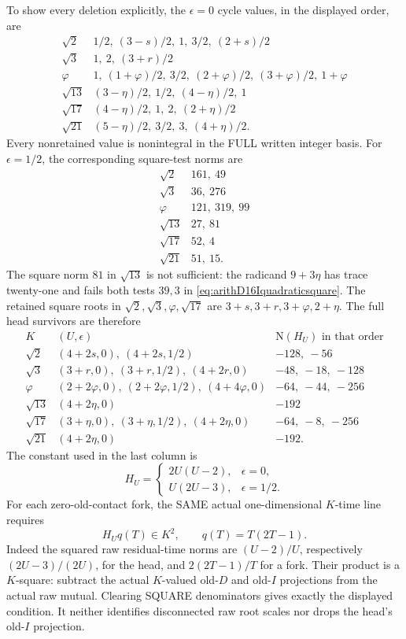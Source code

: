 To show every deletion explicitly,
the \(\epsilon=0\) cycle values,
in the displayed order, are
\[
\begin{array}{c|l}
 \sqrt2&1/2,\ (3-s)/2,\ 1,\ 3/2,\ (2+s)/2\\
 \sqrt3&1,\ 2,\ (3+r)/2\\
 \varphi&1,\ (1+\varphi)/2,\ 3/2,\ (2+\varphi)/2,\
                       (3+\varphi)/2,\ 1+\varphi\\
 \sqrt{13}&(3-\eta)/2,\ 1/2,\ (4-\eta)/2,\ 1\\
 \sqrt{17}&(4-\eta)/2,\ 1,\ 2,\ (2+\eta)/2\\
 \sqrt{21}&(5-\eta)/2,\ 3/2,\ 3,\ (4+\eta)/2 .
\end{array}
\]
Every nonretained value is
nonintegral in the FULL written
integer basis.
For \(\epsilon=1/2\), the corresponding
square-test norms are
\[
\begin{array}{c|l}
 \sqrt2&161,\ 49\\
 \sqrt3&36,\ 276\\
 \varphi&121,\ 319,\ 99\\
 \sqrt{13}&27,\ 81\\
 \sqrt{17}&52,\ 4\\
 \sqrt{21}&51,\ 15 .
\end{array}
\]
The square norm \(81\) in
\(\sqrt{13}\) is not sufficient:
the radicand \(9+3\eta\) has trace
twenty-one and fails both tests
\(39,3\) in
\eqref{eq:arithD16Iquadraticsquare}.
The retained square roots in
\(\sqrt2,\sqrt3,\varphi,\sqrt{17}\)
are \(3+s,3+r,3+\varphi,2+\eta\).
The full head survivors are therefore
\[
\begin{array}{c|l|l}
 K&(U,\epsilon)&\mathrm N(H_U)\text{ in that order}\\ \hline
 \sqrt2&(4+2s,0),\ (4+2s,1/2)&-128,\ -56\\
 \sqrt3&(3+r,0),\ (3+r,1/2),\ (4+2r,0)&-48,\ -18,\ -128\\
 \varphi&(2+2\varphi,0),\ (2+2\varphi,1/2),\
             (4+4\varphi,0)&-64,\ -44,\ -256\\
 \sqrt{13}&(4+2\eta,0)&-192\\
 \sqrt{17}&(3+\eta,0),\ (3+\eta,1/2),\
             (4+2\eta,0)&-64,\ -8,\ -256\\
 \sqrt{21}&(4+2\eta,0)&-192 .
\end{array}
\]
The constant used in the last
column is
\[
 H_U=
 \begin{cases}
  2U(U-2),&\epsilon=0,\\
  U(2U-3),&\epsilon=1/2 .
 \end{cases}
\]
For each zero-old-contact fork,
the SAME actual one-dimensional
\(K\)-time line requires
\[
                              H_Uq(T)\in K^2,\qquad q(T)=T(2T-1).
\tag{D16IQheadfork}\label{eq:arithD16Iquadraticheadfork}
\]
Indeed the squared raw residual-time
norms are \((U-2)/U\), respectively
\((2U-3)/(2U)\), for the head,
and \(2(2T-1)/T\) for a fork.
Their product is a \(K\)-square:
subtract the actual \(K\)-valued
old-\(D\) and old-\(I\) projections
from the actual raw mutual.
Clearing SQUARE denominators gives
exactly the displayed condition.
It neither identifies disconnected
raw root scales nor drops the head's
old-\(I\) projection.

